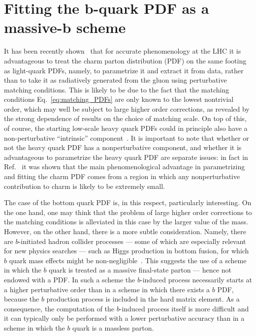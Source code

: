 \chapter{Fitting the b-quark PDF as a massive-b scheme}
\label{ch:bottom}

It has been recently shown~\cite{Ball:2017nwa} that for accurate
phenomenology at the LHC it is advantageous to treat the charm parton
distribution (PDF) on the same footing as light-quark PDFs, namely, to
parametrize it and extract it from data, rather than to take it
as radiatively generated from the gluon using  perturbative matching
conditions. This is likely to be
due to the fact that the matching conditions Eq.~\ref{eq:matching_PDFs} are only known to
the lowest nontrivial order, which may well be subject to large higher
order
corrections, as revealed by the strong dependence of results on the
choice of matching scale. On top of this, of course,
the starting low-scale heavy quark
PDFs could in principle also have a
non-perturbative ``intrinsic''
component~\cite{Brodsky:1980pb,PhysRevD.23.2745}. It is important to note  that
whether or not the heavy quark PDF has a nonperturbative component,
and whether it is advantageous to parametrize the heavy quark PDF are
separate issues: in fact in Ref.~\cite{Ball:2017nwa} it was shown that
the main phenomenological
advantage in parametrizing and fitting the charm PDF comes from a region in
which any nonperturbative contribution to charm is likely to be
extremely small. 

The case of the bottom quark PDF is, in this respect, particularly
interesting. On the one hand, one may think that the problem of
large higher order corrections to the matching conditions is alleviated
in this case by the larger value of the mass. However, on the other
hand, there is a more subtle consideration. Namely, there are $b$-initiated
hadron collider processes --- some of which
are especially relevant for new physics searches --- such as Higgs production in
bottom fusion, for which $b$ quark mass effects might be
non-negligible~\cite{Maltoni:2012pa,Lim:2016wjo,Bagnaschi:2018dnh}. This
suggests the use of a scheme in which the $b$ quark is
treated as a 
massive final-state parton --- hence not endowed with a
PDF. In such a scheme
the $b$-induced process necessarily
starts at a higher perturbative order than in  a scheme in which
there exists a $b$ PDF, because the $b$ production process is included in the
hard matrix element. As a consequence, the computation of the
$b$-induced process itself is more difficult and it can typically
only be performed with a lower perturbative accuracy than in a scheme
in which the $b$ quark is a massless parton.

